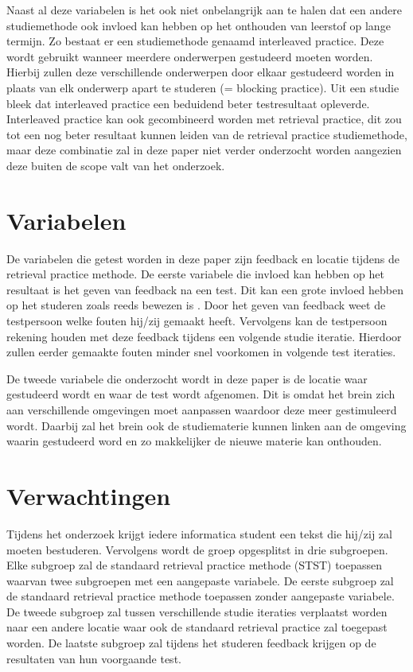 \documentclass{hogent-article}
\begin{document}
    Naast al deze variabelen is het ook niet onbelangrijk aan te halen dat een andere studiemethode ook invloed kan hebben op het onthouden van leerstof op lange termijn. Zo bestaat er een studiemethode genaamd interleaved practice. Deze wordt gebruikt wanneer meerdere onderwerpen gestudeerd moeten worden. Hierbij zullen deze verschillende onderwerpen door elkaar gestudeerd worden in plaats van elk onderwerp apart te studeren (= blocking practice). Uit een studie \autocite{taylor2010effects} bleek dat interleaved practice een beduidend beter testresultaat opleverde. Interleaved practice kan ook gecombineerd worden met retrieval practice, dit zou tot een nog beter resultaat kunnen leiden van de retrieval practice studiemethode, maar deze combinatie zal in deze paper niet verder onderzocht worden aangezien deze buiten de scope valt van het onderzoek.
    
	
	\section{Variabelen}    
    De variabelen die getest worden in deze paper zijn feedback en locatie tijdens de retrieval practice methode.
    De eerste variabele die invloed kan hebben op het resultaat is het geven van feedback na een test. Dit kan een grote invloed hebben op het studeren zoals reeds bewezen is \autocite{roediger2011critical, brame2015test}.
    Door het geven van feedback weet de testpersoon welke fouten hij/zij gemaakt heeft. Vervolgens kan de testpersoon rekening houden met deze feedback tijdens een volgende studie iteratie. Hierdoor zullen eerder gemaakte fouten minder snel voorkomen in volgende test iteraties.
    
    De tweede variabele die onderzocht wordt in deze paper is de locatie waar gestudeerd wordt en waar de test wordt afgenomen. Dit is omdat het brein zich aan verschillende omgevingen moet aanpassen waardoor deze meer gestimuleerd wordt. Daarbij zal het brein ook de studiematerie kunnen linken aan de omgeving waarin gestudeerd word en zo makkelijker de nieuwe materie kan onthouden.
    
    \section{Verwachtingen}
    Tijdens het onderzoek krijgt iedere informatica student een tekst die hij/zij zal moeten bestuderen. Vervolgens wordt de groep opgesplitst in drie subgroepen. Elke subgroep zal de standaard retrieval practice methode (STST) toepassen waarvan twee subgroepen met een aangepaste variabele.
    De eerste subgroep zal de standaard retrieval practice methode toepassen zonder aangepaste variabele. 
    De tweede subgroep zal tussen verschillende studie iteraties verplaatst worden naar een andere locatie waar ook de standaard retrieval practice zal toegepast worden.
    De laatste subgroep zal tijdens het studeren feedback krijgen op de resultaten van hun voorgaande test.
    
\end{document}
